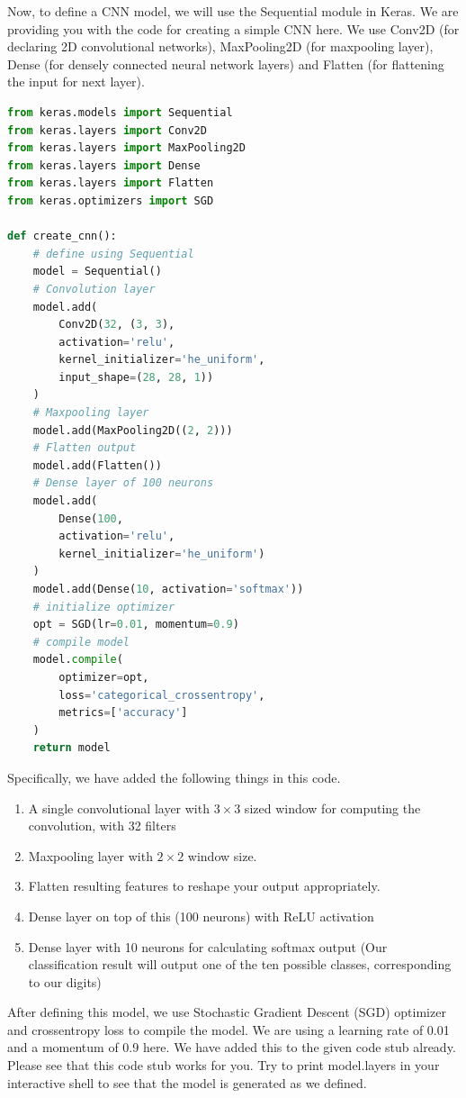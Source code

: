 \documentclass[10pt, a4paper]{article}
\begin{document}
\begin{Problem*}[(c) Implementation]
Now, to define a CNN model, we will use the Sequential module in Keras. We are providing you with the code for creating a simple CNN here. We use Conv2D (for declaring 2D convolutional networks), MaxPooling2D (for maxpooling layer), Dense (for densely connected neural network layers) and Flatten (for flattening the input for next layer).

\begin{lstlisting}[language=Python]
from keras.models import Sequential
from keras.layers import Conv2D
from keras.layers import MaxPooling2D
from keras.layers import Dense
from keras.layers import Flatten
from keras.optimizers import SGD

def create_cnn():
    # define using Sequential
    model = Sequential()
    # Convolution layer
    model.add(
        Conv2D(32, (3, 3),
        activation='relu',
        kernel_initializer='he_uniform',
        input_shape=(28, 28, 1))
    )
    # Maxpooling layer
    model.add(MaxPooling2D((2, 2)))
    # Flatten output
    model.add(Flatten())
    # Dense layer of 100 neurons
    model.add(
        Dense(100,
        activation='relu',
        kernel_initializer='he_uniform')
    )
    model.add(Dense(10, activation='softmax'))
    # initialize optimizer
    opt = SGD(lr=0.01, momentum=0.9)
    # compile model
    model.compile(
        optimizer=opt,
        loss='categorical_crossentropy',
        metrics=['accuracy']
    )
    return model
\end{lstlisting}
Specifically, we have added the following things in this code.
\begin{enumerate}
    \item A single convolutional layer with $3 \times 3$ sized window for computing the convolution, with 32 filters
    \item Maxpooling layer with $2 \times 2$ window size.
    \item Flatten resulting features to reshape your output appropriately.
    \item Dense layer on top of this (100 neurons) with ReLU activation
    \item Dense layer with 10 neurons for calculating softmax output (Our classification result will output one of the ten possible classes, corresponding to our digits)
\end{enumerate}
After defining this model, we use Stochastic Gradient Descent (SGD) optimizer and crossentropy loss to compile the model. We are using a learning rate of 0.01 and a momentum of 0.9 here. We have added this to the given code stub already. Please see that this code stub works for you. Try to print model.layers in your interactive shell to see that the model is generated as we defined.
\end{Problem*}
\end{document}
